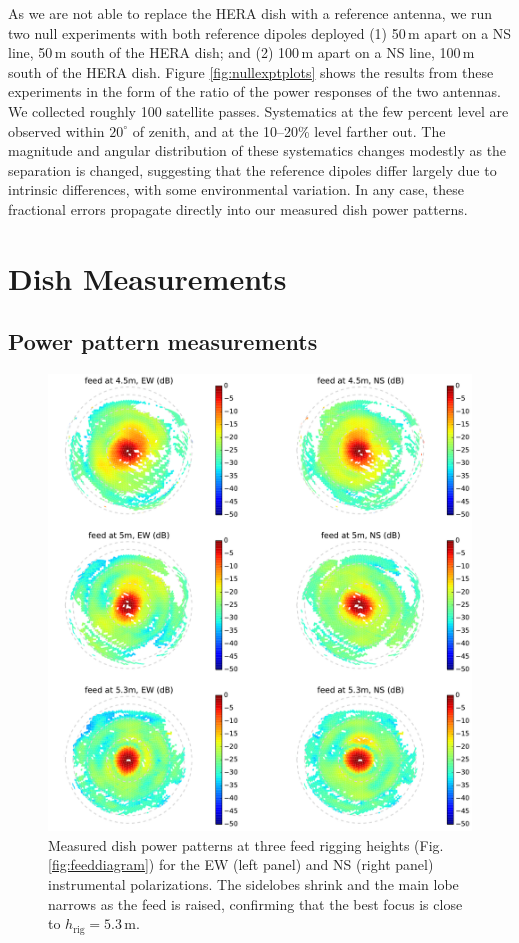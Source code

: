 \documentclass{emulateapj}
\begin{document}
As we are not able to replace the HERA dish with a reference antenna, we run two null experiments with both reference dipoles deployed (1) 50\,m apart on a NS line, 50\,m south of the HERA dish; and (2) 100\,m apart on a NS line, 100\,m south of the HERA dish. Figure \ref{fig:nullexptplots} shows the results from these experiments in the form of the ratio of the power responses of the two antennas. We collected roughly 100 satellite passes. Systematics at the few percent level are observed within $20^\circ$ of zenith, and at the 10--20\% level farther out. The magnitude and angular distribution of these systematics changes modestly as the separation is changed, suggesting that the reference dipoles differ largely due to intrinsic differences, with some environmental variation. In any case, these fractional errors propagate directly into our measured dish power patterns.

\section{Dish Measurements}

\subsection{Power pattern measurements}
\label{sec:powerpatternmeasurements}

\begin{figure}[t]
\centering
\includegraphics[width=6.5in]{measured_beams_and_models_maps.pdf}
\caption{Measured dish power patterns at three feed rigging heights (Fig. \ref{fig:feeddiagram}) for the EW (left panel) and NS (right panel) instrumental polarizations. The sidelobes shrink and the main lobe narrows as the feed is raised, confirming that the best focus is close to $h_\text{rig}=5.3$\,m.}
\label{fig:measuredbeammaps}
\end{figure}
\end{document}
